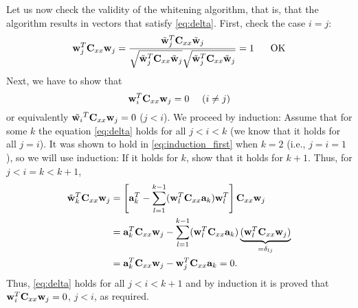 \begin{enumerate}
\begin{solution}
\begin{enumerate}
      Let us now check the validity of the whitening algorithm, that
      is, that the algorithm results in vectors that satisfy
      \eqref{eq:delta}.  First, check the case $i=j$:
      \begin{equation}
        \mathbf{w}_j^T\mathbf{C}_{xx}\mathbf{w}_j =\frac
        {\tilde{\mathbf{w}}_j^T\mathbf{C}_{xx}\tilde{\mathbf{w}}_j} {
          \sqrt{\tilde{\mathbf{w}}_j^T\mathbf{C}_{xx}\tilde{\mathbf{w}}_j}
          \sqrt{\tilde{\mathbf{w}}_j^T\mathbf{C}_{xx}\tilde{\mathbf{w}}_j} } =
        1 \hspace{6mm} \text{OK}
        \label{eq:induction_first}
      \end{equation}
      Next, we have to show that
      \begin{equation*}
        \mathbf{w}_i^T  \mathbf{C}_{xx} \mathbf{w}_j  = 0 \mbox{\ \ \ \ $(i \neq j)$}
      \end{equation*}
      or equivalently $\tilde{\mathbf{w}_i}^T \mathbf{C}_{xx} \mathbf{w}_j =
      0$ ($j < i$).  We proceed by induction: Assume that for some $k$
      the equation \eqref{eq:delta} holds for all $j<i<k$ (we know
      that it holds for all $j=i$).  It was shown to hold in
      \eqref{eq:induction_first} when $k=2$ (i.e., $j=i=1$), so we
      will use induction: If it holds for $k$, show that it holds for
      $k+1$.  Thus, for $j < i=k<k+1$,
      \begin{align*}
        \tilde{\mathbf{w}}_k^T \mathbf{C}_{xx} \mathbf{w}_j &= \left[
          \mathbf{a}_k^T  - \sum_{l=1}^{k-1} (
          \mathbf{w}_l^T \mathbf{C}_{xx} \mathbf{a}_k ) \mathbf{w}_l^T \right]
        \mathbf{C}_{xx} \mathbf{w}_j 
      \\
      &= \mathbf{a}_k^T \mathbf{C}_{xx} \mathbf{w}_j - \sum_{l=1}^{k-1} (
      \mathbf{w}_l^T \mathbf{C}_{xx} \mathbf{a}_k ) \underbrace{(
        \mathbf{w}_l^T \mathbf{C}_{xx} \mathbf{w}_j )}_{=\delta_{lj}}
      \\
      &= \mathbf{a}_k^T \mathbf{C}_{xx} \mathbf{w}_j - \mathbf{w}_j^T
      \mathbf{C}_{xx} \mathbf{a}_k = 0.
      \end{align*}
      Thus, \eqref{eq:delta} holds for all $j<i<k+1$ and by induction
      it is proved that $\mathbf{w}_i^T \mathbf{C}_{xx} \mathbf{w}_j = 0$,
      $j<i$, as required.
      



\end{enumerate}
\end{solution}
\end{enumerate}

